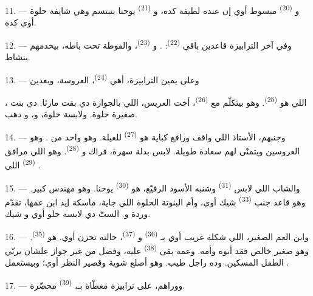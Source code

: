 11. --- و \textsuperscript{(20)} مبسوط أوي إن عنده 
لطيفة كده، و \textsuperscript{(21)} يوحنا بتبتسم وهي شايفة 
حلوة أوي كده.

12. --- وفي آخر الترابيزة قاعدين باقي  \textsuperscript{(22)}:
. و
\textsuperscript{(23)}، والفوطة تحت باطه، بيخدمهم بنشاط.

\VUsaut{3.0mm}

13. --- وعلى يمين الترابيزة، أهي  \textsuperscript{(24)}، 
العروسة، وبعدين

، اللي هو  \textsuperscript{(25)}. وهو بيتكلّم مع
 \textsuperscript{(26)}، أخت العريس، اللي بالجوازة دي بقت
 مارثا. دي بنت صغيرة حلوة. ولابسة  حلوة،
و، و دهب.

14. --- وجنبهم، الأستاذ اللي واقف ورافع كباية هو 
\textsuperscript{(27)} للعيلة. وهو واحد من . وهو  العروسين ويتمنّى لهم سعادة طويلة. لابس بدلة سهرة، فراك
و \textsuperscript{(28)}. وهو اللي مرافق 
\textsuperscript{(29)} اللي .

15. --- والشاب اللي لابس  \textsuperscript{(31)} وشنبه الأسود الرفيّع، هو
 \textsuperscript{(30)} يوحنا. وهو مهندس كبير. وهو قاعد جنب  \textsuperscript{(33)} شيك أوي،  وأم البنوتة الحلوة اللي
جاية، ماسكة إيد ابن عمها، تقدّم وردة و. الستّ دي
لابسة  حلو أوي و شيك.

16. --- وابن العم الصغير، اللي شكله غريب أوي بـ
\textsuperscript{(36)} و \textsuperscript{(37)}، حالته تحزن
أوي. هو  \textsuperscript{(35)}. وهو صغير خالص فقد أبوه وأمه. وعمه بقى
 \textsuperscript{(38)} عليه، وفضل من غير جواز علشان يربّي الطفل المسكين.
وده راجل طيب. وهو أصلع شوية وقصير النظر أوي؛ وبيستعمل .

\VUsaut{2.4mm}
\VUsaut{3.0mm}

17. --- ووراهم، على ترابيزة مغطّاة بـ، 
\textsuperscript{(39)} محضّرة.

